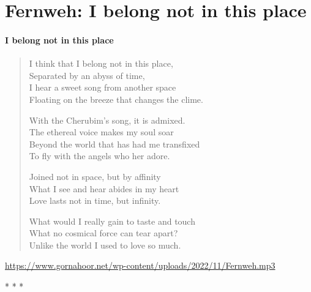 \section{Fernweh: I belong not in this place}

\paragraph{I belong not in this place}

\begin{verse}
I think that I belong not in this place,\\
Separated by an abyss of time,\\
I hear a sweet song from another space\\
Floating on the breeze that changes the clime.

With the Cherubim's song, it is admixed.\\
The ethereal voice makes my soul soar\\
Beyond the world that has had me transfixed\\
To fly with the angels who her adore.

Joined not in space, but by affinity\\
What I see and hear abides in my heart\\
Love lasts not in time, but infinity.

What would I really gain to taste and touch\\
What no cosmical force can tear apart?\\
Unlike the world I used to love so much.
\end{verse}

\url{https://www.gornahoor.net/wp-content/uploads/2022/11/Fernweh.mp3}




\begin{center}* * *\end{center}

